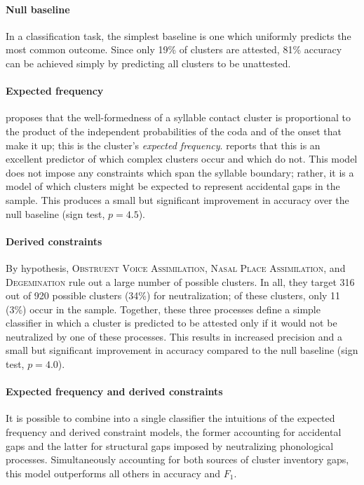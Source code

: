 \paragraph{Null baseline} 
In a classification task, the simplest baseline is one which uniformly predicts the most common outcome.
Since only 19\% of clusters are attested, 81\% accuracy can be achieved simply by predicting all clusters to be unattested.

\paragraph{Expected frequency} 
\citet{Pierrehumbert1994} proposes that the well-formedness of a syllable contact cluster is proportional to the product of the independent probabilities of the coda and of the onset that make it up; this is the cluster's \emph{expected frequency}.
\citeauthor{Pierrehumbert1994} reports that this is an excellent predictor of which complex clusters occur and which do not.
This model does not impose any constraints which span the syllable boundary; rather, it is a model of which clusters might be expected to represent accidental gaps in the sample.
This produces a small but significant improvement in accuracy over the null baseline (sign test, $p = 4.5$).

\paragraph{Derived constraints} 
By hypothesis, \textsc{Obstruent Voice Assimilation}, \textsc{Nasal Place Assimilation}, and \textsc{Degemination} rule out a large number of possible clusters. 
In all, they target 316 out of 920 possible clusters (34\%) for neutralization;
of these clusters, only 11 (3\%) occur in the sample.
Together, these three processes define a simple classifier in which a cluster is predicted to be attested only if it would not be neutralized by one of these processes.
This results in increased precision and a small but significant improvement in accuracy compared to the null baseline (sign test, $p = 4.0$).

\paragraph{Expected frequency and derived constraints}
It is possible to combine into a single classifier the intuitions of the expected frequency and derived constraint models, the former accounting for accidental gaps and the latter for structural gaps imposed by neutralizing phonological processes.
Simultaneously accounting for both sources of cluster inventory gaps, this model outperforms all others in accuracy and $F_1$.

